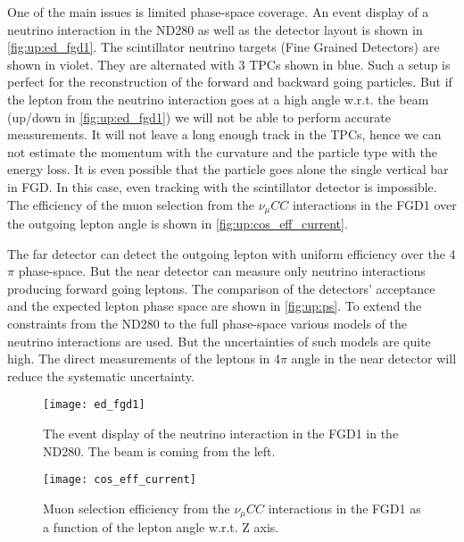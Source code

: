 \documentclass[main.tex]{subfiles}
\begin{document}
One of the main issues is limited phase-space coverage. An event display of a neutrino interaction in the ND280 as well as the detector layout is shown in \autoref{fig:up:ed_fgd1}. The scintillator neutrino targets (Fine Grained Detectors) are shown in violet. They are alternated with 3 TPCs shown in blue. Such a setup is perfect for the reconstruction of the forward and backward going particles. But if the lepton from the neutrino interaction goes at a high angle w.r.t. the beam (up/down in \autoref{fig:up:ed_fgd1}) we will not be able to perform accurate measurements. It will not leave a long enough track in the TPCs, hence we can not estimate the momentum with the curvature and the particle type with the energy loss. It is even possible that the particle goes alone the single vertical bar in FGD. In this case, even tracking with the scintillator detector is impossible. The efficiency of the muon selection from the $\nu_\mu CC$ interactions in the FGD1 over the outgoing lepton angle is shown in \autoref{fig:up:cos_eff_current}.

The far detector can detect the outgoing lepton with uniform efficiency over the 4$\pi$ phase-space. But the near detector can measure only neutrino interactions producing forward going leptons. The comparison of the detectors' acceptance and the expected lepton phase space are shown in \autoref{fig:up:ps}. To extend the constraints from the ND280 to the full phase-space various models of the neutrino interactions are used. But the uncertainties of such models are quite high. The direct measurements of the leptons in 4$\pi$ angle in the near detector will reduce the systematic uncertainty.

\begin{figure}[!ht]
  \centering
  \begin{minipage}{0.49\linewidth}
      \begin{flushleft}
      \begin{minipage}{0.9\linewidth}
      \texttt{[image: ed\_fgd1]}
      \caption{The event display of the neutrino interaction in the FGD1 in the ND280. The beam is coming from the left.}
      \label{fig:up:ed_fgd1}
      \end{minipage}
      \begin{minipage}{0.1\linewidth}
      \end{minipage}
      \end{flushleft}
  \end{minipage}
  \begin{minipage}{0.49\linewidth}
      \begin{flushright}
      \begin{minipage}{0.1\linewidth}
      \end{minipage}
      \begin{minipage}{0.9\linewidth}
      \texttt{[image: cos\_eff\_current]}
      \caption{Muon selection efficiency from the $\nu_\mu CC$ interactions in the FGD1 as a function of the lepton angle w.r.t. Z axis.}
      \label{fig:up:cos_eff_current}
      \end{minipage}
      \end{flushright}
  \end{minipage}
\end{figure}
\end{document}
